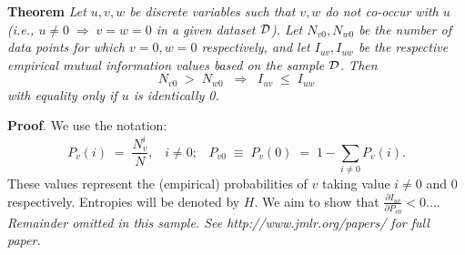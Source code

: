 \documentclass[twoside,11pt]{article}
\newcommand{\dataset}{{\cal D}}
\newcommand{\fracpartial}[2]{\frac{\partial #1}{\partial  #2}}
\newcommand{\0}{\mathbf{0}} %
\begin{document}
\noindent
{\bf Theorem} {\it Let $u,v,w$ be discrete variables such that $v, w$ do
not co-occur with $u$ (i.e., $u\neq0\;\Rightarrow \;v=w=0$ in a given
dataset $\dataset$). Let $N_{v0},N_{w0}$ be the number of data points for
which $v=0, w=0$ respectively, and let $I_{uv},I_{uw}$ be the
respective empirical mutual information values based on the sample
$\dataset$. Then
\[
	N_{v0} \;>\; N_{w0}\;\;\Rightarrow\;\;I_{uv} \;\leq\;I_{uw}
\]
with equality only if $u$ is identically 0.} \hfill\BlackBox

\noindent
{\bf Proof}. We use the notation:
\[
P_v(i) \;=\;\frac{N_v^i}{N},\;\;\;i \neq 0;\;\;\;
P_{v0}\;\equiv\;P_v(0)\; = \;1 - \sum_{i\neq 0}P_v(i).
\]
These values represent the (empirical) probabilities of $v$
taking value $i\neq 0$ and 0 respectively.  Entropies will be denoted
by $H$. We aim to show that $\fracpartial{I_{uv}}{P_{v0}} < 0$....\\

{\noindent \em Remainder omitted in this sample. See http://www.jmlr.org/papers/ for full paper.}


\vskip 0.2in

\end{document}
